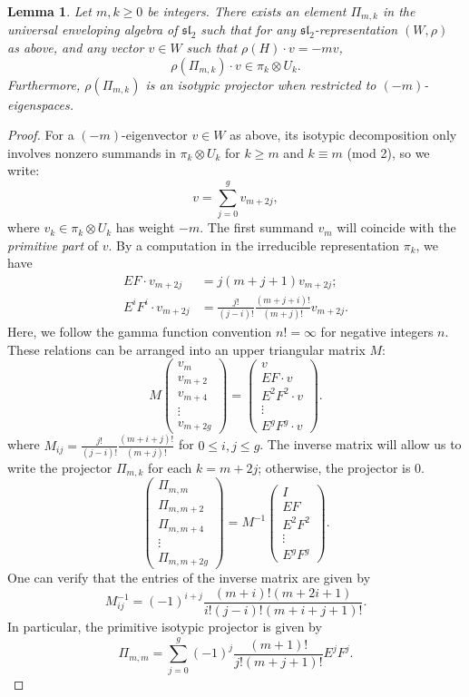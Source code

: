 \documentclass[11pt,letterpaper,english]{amsart}
\numberwithin{equation}{subsection}
\numberwithin{equation}{section}
\theoremstyle{plain}
\newtheorem{lemma}[theorem]{Lemma}
\theoremstyle{remark}
\begin{document}
\begin{lemma}\label{lemma:projector}
Let $m,k\geq 0$ be integers. There exists an element $\Pi_{m,k}$ in the universal enveloping algebra of $\mathfrak{sl}_2$ such that for any $\mathfrak{sl}_2$-representation $(W,\rho)$ as above, and any vector $v\in W$ such that $\rho(H)\cdot v=-mv$,
$$\rho(\Pi_{m,k})\cdot v \in \pi_k\otimes U_k.$$
Furthermore, $\rho(\Pi_{m,k})$ is an isotypic projector when restricted to $(-m)$-eigenspaces.
\end{lemma}
\begin{proof}
    For a $(-m)$-eigenvector $v\in W$ as above, its isotypic decomposition only involves nonzero summands in $\pi_k\otimes U_k$ for $k\geq m$ and $k\equiv m$ (mod 2), so we write:
    $$v = \sum_{j=0}^g v_{m+2j},$$
    where $v_k \in \pi_k\otimes U_k$ has weight $-m$. The first summand $v_m$ will coincide with the {\it primitive part} of $v$. By a computation in the irreducible representation $\pi_k$, we have
    \begin{align*}
EF\cdot v_{m+2j} &= j(m+j+1)v_{m+2j};\\
E^iF^i\cdot v_{m+2j} &= \frac{j!}{(j-i)!}\frac{(m+j+i)!}{(m+j)!} v_{m+2j}.
    \end{align*}
Here, we follow the gamma function convention $n!=\infty$ for negative integers $n$.
These relations can be arranged into an upper triangular matrix $M$:
$$M \begin{pmatrix} v_m \\ v_{m+2} \\ v_{m+4} \\ \vdots \\ v_{m+2g} \end{pmatrix} = \begin{pmatrix} v \\ EF\cdot v \\ E^2F^2 \cdot v \\ \vdots \\ E^gF^g\cdot v\end{pmatrix}.$$
where $M_{ij} = \frac{j!}{(j-i)!}\frac{(m+i+j)!}{(m+j)!}$ for $0\leq i,j\leq g$. The inverse matrix will allow us to write the projector $\Pi_{m,k}$ for each $k=m+2j$; otherwise, the projector is 0.
$$\begin{pmatrix} \Pi_{m,m} \\ \Pi_{m,m+2} \\ \Pi_{m,m+4}  \\ \vdots \\ \Pi_{m,m+2g}\end{pmatrix} = M^{-1} \begin{pmatrix} I \\ EF \\ E^2F^2  \\ \vdots \\ E^gF^g\end{pmatrix}.$$
One can verify that the entries of the inverse matrix are given by
$$M^{-1}_{ij} = (-1)^{i+j} \frac{(m+i)!(m+2i+1)}{i!(j-i)!(m+i+j+1)!}.$$
In particular, the primitive isotypic projector is given by
$$\Pi_{m,m} = \sum_{j=0}^g (-1)^j \frac{(m+1)!}{j!(m+j+1)!} E^j F^j.$$
\end{proof}
\end{document}

